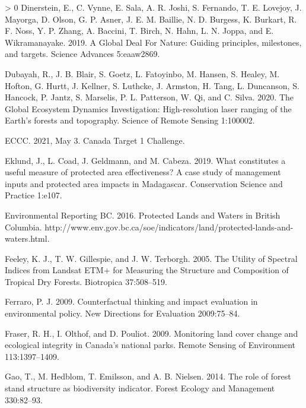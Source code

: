 \documentclass[10pt,oneside]{article}
\newlength{\cslhangindent}
\newenvironment{CSLReferences}[3] %
 {%
  \setlength{\parindent}{0pt}
  \ifodd #1 \everypar{\setlength{\hangindent}{\cslhangindent}}\ignorespaces\fi
  \ifnum #2 > 0
  \setlength{\parskip}{#2\baselineskip}
  \fi
 }%
 {}
\begin{document}
\begin{CSLReferences}{1}{0}
\leavevmode\hypertarget{ref-dinerstein2019}{}%
Dinerstein, E., C. Vynne, E. Sala, A. R. Joshi, S. Fernando, T. E.
Lovejoy, J. Mayorga, D. Olson, G. P. Asner, J. E. M. Baillie, N. D.
Burgess, K. Burkart, R. F. Noss, Y. P. Zhang, A. Baccini, T. Birch, N.
Hahn, L. N. Joppa, and E. Wikramanayake. 2019. A Global Deal For Nature:
Guiding principles, milestones, and targets. Science Advances
5:eaaw2869.

\leavevmode\hypertarget{ref-dubayahGlobalEcosystemDynamics2020}{}%
Dubayah, R., J. B. Blair, S. Goetz, L. Fatoyinbo, M. Hansen, S. Healey,
M. Hofton, G. Hurtt, J. Kellner, S. Luthcke, J. Armston, H. Tang, L.
Duncanson, S. Hancock, P. Jantz, S. Marselis, P. L. Patterson, W. Qi,
and C. Silva. 2020. The Global Ecosystem Dynamics Investigation:
High-resolution laser ranging of the Earth's forests and topography.
Science of Remote Sensing 1:100002.

\leavevmode\hypertarget{ref-eccc2021}{}%
ECCC. 2021, May 3. Canada Target 1 Challenge.

\leavevmode\hypertarget{ref-eklundWhatConstitutesUseful2019}{}%
Eklund, J., L. Coad, J. Geldmann, and M. Cabeza. 2019. What constitutes
a useful measure of protected area effectiveness? A case study of
management inputs and protected area impacts in Madagascar. Conservation
Science and Practice 1:e107.

\leavevmode\hypertarget{ref-environmentalreportingbc2016}{}%
Environmental Reporting BC. 2016. Protected Lands and Waters in British
Columbia.
http://www.env.gov.bc.ca/soe/indicators/land/protected-lands-and-waters.html.

\leavevmode\hypertarget{ref-feeley2005}{}%
Feeley, K. J., T. W. Gillespie, and J. W. Terborgh. 2005. The Utility of
Spectral Indices from Landsat ETM+ for Measuring the Structure and
Composition of Tropical Dry Forests. Biotropica 37:508--519.

\leavevmode\hypertarget{ref-ferraroCounterfactualThinkingImpact2009}{}%
Ferraro, P. J. 2009. Counterfactual thinking and impact evaluation in
environmental policy. New Directions for Evaluation 2009:75--84.

\leavevmode\hypertarget{ref-fraserMonitoringLandCover2009}{}%
Fraser, R. H., I. Olthof, and D. Pouliot. 2009. Monitoring land cover
change and ecological integrity in Canada's national parks. Remote
Sensing of Environment 113:1397--1409.

\leavevmode\hypertarget{ref-gao2014}{}%
Gao, T., M. Hedblom, T. Emilsson, and A. B. Nielsen. 2014. The role of
forest stand structure as biodiversity indicator. Forest Ecology and
Management 330:82--93.


\end{CSLReferences}
\end{document}
